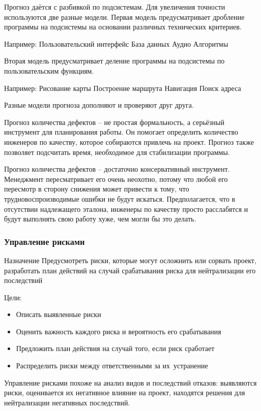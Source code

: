 \documentclass{../industrial-development}
\begin{document}
Прогноз даётся с разбивкой по подсистемам. Для увеличения точности используются две разные модели. Первая модель предусматривает дробление программы на подсистемы на основании различных технических критериев.

Например:
Пользовательский интерфейс
База данных
Аудио
Алгоритмы

Вторая модель предусматривает деление программы на подсистемы по пользовательским функциям.

Например:
Рисование карты
Построение маршрута
Навигация
Поиск адреса

Разные модели прогноза дополняют и проверяют друг друга.

Прогноз количества дефектов – не простая формальность, а серьёзный инструмент для планирования работы. Он помогает определить количество инженеров по качеству, которое собираются привлечь на проект. Прогноз также позволяет подсчитать время, необходимое для стабилизации программы.

Прогноз количества дефектов – достаточно консервативный инструмент. Менеджмент пересматривает его очень неохотно, потому что любой его пересмотр в сторону снижения может привести к тому, что трудновоспроизводимые ошибки не будут искаться. Предполагается, что в отсутствии надлежащего эталона, инженеры по качеству просто расслабятся и будут выполнять свою работу хуже, чем могли бы это делать.

\begin{frame} \frametitle{Управление рисками}
	\begin{block}{Назначение}
		Предусмотреть риски, которые могут осложнить или сорвать проект, разработать план действий на случай срабатывания риска для нейтрализации его последствий
	\end{block}
	Цели:
	\begin{itemize}
		\item Описать выявленные риски
		\item Оценить важность каждого риска и вероятность его срабатывания
		\item Предложить план действия на случай того, если риск сработает
		\item Распределить риски между ответственными за их~устранение
	\end{itemize}
\end{frame}
\lecturenotes

Управление рисками похоже на анализ видов и последствий отказов: выявляются риски, оценивается их негативное влияние на проект, находятся решения для нейтрализации негативных последствий.
\end{document}
